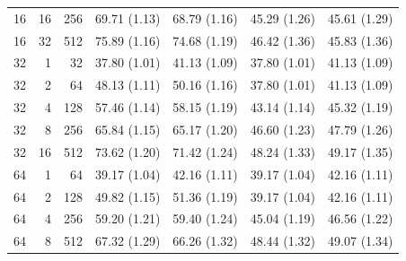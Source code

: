 \begin{table}[p]
\begin{tabular}{@{}rrr rrrr@{}}
16 & 16 & 256 & 69.71 {\scriptsize (1.13)} & 68.79 {\scriptsize (1.16)} & 45.29 {\scriptsize (1.26)} & 45.61 {\scriptsize (1.29)} \\
16 & 32 & 512 & 75.89 {\scriptsize (1.16)} & 74.68 {\scriptsize (1.19)} & 46.42 {\scriptsize (1.36)} & 45.83 {\scriptsize (1.36)} \\
\midrule
32 & 1 & 32 & 37.80 {\scriptsize (1.01)} & 41.13 {\scriptsize (1.09)} & 37.80 {\scriptsize (1.01)} & 41.13 {\scriptsize (1.09)} \\
32 & 2 & 64 & 48.13 {\scriptsize (1.11)} & 50.16 {\scriptsize (1.16)} & 37.80 {\scriptsize (1.01)} & 41.13 {\scriptsize (1.09)} \\
32 & 4 & 128 & 57.46 {\scriptsize (1.14)} & 58.15 {\scriptsize (1.19)} & 43.14 {\scriptsize (1.14)} & 45.32 {\scriptsize (1.19)} \\
32 & 8 & 256 & 65.84 {\scriptsize (1.15)} & 65.17 {\scriptsize (1.20)} & 46.60 {\scriptsize (1.23)} & 47.79 {\scriptsize (1.26)} \\
32 & 16 & 512 & 73.62 {\scriptsize (1.20)} & 71.42 {\scriptsize (1.24)} & 48.24 {\scriptsize (1.33)} & 49.17 {\scriptsize (1.35)} \\
\midrule
64 & 1 & 64 & 39.17 {\scriptsize (1.04)} & 42.16 {\scriptsize (1.11)} & 39.17 {\scriptsize (1.04)} & 42.16 {\scriptsize (1.11)} \\
64 & 2 & 128 & 49.82 {\scriptsize (1.15)} & 51.36 {\scriptsize (1.19)} & 39.17 {\scriptsize (1.04)} & 42.16 {\scriptsize (1.11)} \\
64 & 4 & 256 & 59.20 {\scriptsize (1.21)} & 59.40 {\scriptsize (1.24)} & 45.04 {\scriptsize (1.19)} & 46.56 {\scriptsize (1.22)} \\
64 & 8 & 512 & 67.32 {\scriptsize (1.29)} & 66.26 {\scriptsize (1.32)} & 48.44 {\scriptsize (1.32)} & 49.07 {\scriptsize (1.34)} \\
\bottomrule
\end{tabular}
\end{table}
